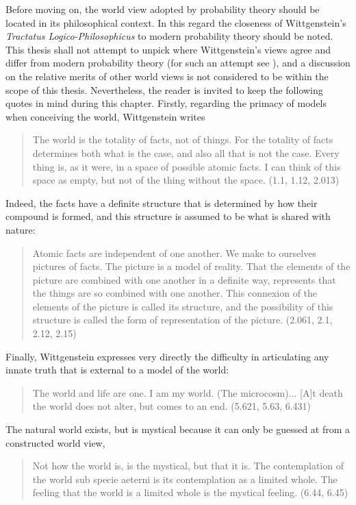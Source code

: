 {Before moving on,
the world view adopted by probability theory should be located in its philosophical context.
In this regard the closeness of Wittgenstein's {\em Tractatus Logico-Philosophicus} to modern probability theory should be noted. 
This thesis shall not attempt to unpick where Wittgenstein's views agree and differ from modern probability theory 
(for such an attempt see \cite{WittgensteinLattice}),
and a discussion on the relative merits of other world views is not considered to be within the scope of this thesis.
Nevertheless, %
the reader is invited to keep the following quotes in mind during this chapter.
Firstly, regarding the primacy of models when conceiving the world,  Wittgenstein writes 
\begin{quote}
  The world is the totality of facts, not of things.  For the totality of facts determines both what is the case, and also all that is not the case.  Every thing is, as it were, in a space of possible atomic facts. I can think of this space as empty, but not of the thing without the space. (1.1, 1.12, 2.013)
\end{quote}
Indeed, the facts have a definite structure that is determined by how their compound is formed,
and this structure is assumed to be what is shared with nature:
\begin{quote}
Atomic facts are independent of one another. We make to ourselves pictures of facts. The picture is a model of reality.    
That the elements of the picture are combined with one another in a definite way, represents that the things are so combined with one another.
This connexion of the elements of the picture is called its structure, and the possibility of this structure is called the form of representation of the picture.  (2.061, 2.1, 2.12, 2.15)
\end{quote}
Finally, Wittgenstein expresses very directly the  difficulty in articulating any innate truth that is external to a model of the world:
\begin{quote}
The world and life are one. I am my world. (The microcosm)... [A]t death the world does not alter, but comes to an end. (5.621, 5.63, 6.431)
\end{quote}
The natural world exists, but is  mystical because it can only be guessed at from a constructed world view,
\begin{quote}
Not how the world is, is the mystical, but that it is.  
The contemplation of the world sub specie aeterni is its contemplation as a limited whole. 
The feeling that the world is a limited whole is the mystical feeling. (6.44, 6.45)
\end{quote}






}
